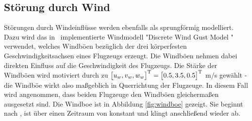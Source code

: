 \subsection{Störung durch Wind}
Störungen durch Windeinflüsse werden ebenfalls als sprungförmig modelliert. Dazu wird das in \Simulink\, implementierte Windmodell "Discrete Wind Gust Model \cite{windmodel}"\, verwendet, welches Windböen bezüglich der drei körperfesten Geschwindigkeitsachsen eines Flugzeugs erzeugt. Die Windböen nehmen dabei direkten Einfluss auf die Geschwindigkeit des Flugzeugs. Die Stärke der Windböen wird motiviert durch \cite{pollini} zu $\begin{bmatrix}
u_w, v_w, w_w
\end{bmatrix}^{\mathrm{T}} = \begin{bmatrix}
0.5, 3.5, 0.5 
\end{bmatrix}^{\mathrm{T}}$ \unit{m/s} gewählt - die Windböe wirkt also maßgeblich in Querrichtung der Flugzeuge. In diesem Fall wird angenommen, dass beiden Flugzeuge den Windböen gleichermaßen ausgesetzt sind. 
Die Windboe ist in Abbildung \ref{fig:windboe} gezeigt. Sie beginnt nach , ist über einen Zeitraum von  konstant und klingt anschließend wieder ab.
